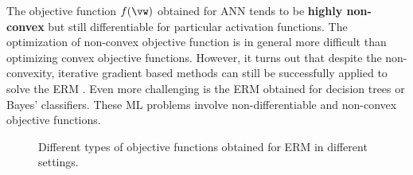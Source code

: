 \documentclass[12pt]{report}
\begin{document}
The objective function $f(\vw)$ obtained for ANN tends to be {\bf highly non-convex} 
but still differentiable for particular activation functions. The optimization of non-convex 
objective function is in general more difficult than optimizing convex objective functions. 
However, it turns out that despite the non-convexity, iterative gradient based methods can 
still be successfully applied to solve the ERM \cite{Goodfellow-et-al-2016}. Even more 
challenging is the ERM obtained for decision trees or Bayes' classifiers. These ML problems 
involve non-differentiable and non-convex objective functions. 


	
\begin{figure}[htbp]
\begin{center}
\end{center}
\caption{Different types of objective functions obtained for ERM in different settings.}
\label{fig_diff_types_bojec}
\end{figure}
\end{document}
